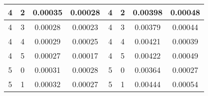 \begin{table}[H]
\begin{tabular}{|c|c|c|c|c|c|c|c|}
4                                      & 2                                      & 0.00035                                                             & 0.00028                                                                 & 4                                      & 2                                     & 0.00398                                                             & 0.00048                                                                 \\ \hline
4                                      & 3                                      & 0.00028                                                             & 0.00023                                                                 & 4                                      & 3                                     & 0.00379                                                             & 0.00044                                                                 \\ \hline
4                                      & 4                                      & 0.00029                                                             & 0.00025                                                                 & 4                                      & 4                                     & 0.00421                                                             & 0.00039                                                                 \\ \hline
4                                      & 5                                      & 0.00027                                                             & 0.00017                                                                 & 4                                      & 5                                     & 0.00422                                                             & 0.00049                                                                 \\ \hline
5                                      & 0                                      & 0.00031                                                             & 0.00028                                                                 & 5                                      & 0                                     & 0.00364                                                             & 0.00027                                                                 \\ \hline
5                                      & 1                                      & 0.00032                                                             & 0.00027                                                                 & 5                                      & 1                                     & 0.00444                                                             & 0.00054                                                                 \\ \hline

\end{tabular}
\end{table}
